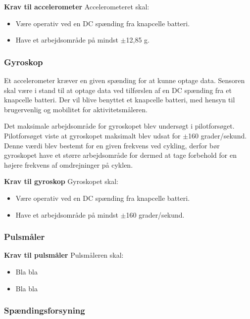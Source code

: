 \textbf{Krav til accelerometer} \newline 
Accelerometeret skal:
\begin{itemize}
\item Være operativ ved en DC spænding fra knapcelle batteri.
\item Have et arbejdsområde på mindst $\pm$12,85 g.
\end{itemize}


\subsubsection{Gyroskop} 
Et accelerometer kræver en given spænding for at kunne optage data. Sensoren skal være i stand til at optage data ved tilførslen af en DC spænding fra et knapcelle batteri. Der vil blive benyttet et knapcelle batteri, med hensyn til brugervenlig og mobilitet for aktivitetsmåleren.\newline

Det maksimale arbejdsområde for gyroskopet blev undersøgt i pilotforsøget. Pilotforsøget viste at gyroskopet maksimalt blev udsat for $\pm$160 grader/sekund. Denne værdi blev bestemt for en given frekvens ved cykling, derfor bør gyroskopet have et større arbejdsområde for dermed at tage forbehold for en højere frekvens af omdrejninger på cyklen. 


\textbf{Krav til gyroskop} \newline
Gyroskopet skal:
\begin{itemize}
\item Være operativ ved en DC spænding fra knapcelle batteri.
\item Have et arbejdsområde på mindst $\pm$160 grader/sekund.
\end{itemize}


\subsubsection{Pulsmåler}

\textbf{Krav til pulsmåler} \newline
Pulsmåleren skal:
\begin{itemize}
\item Bla bla
\item Bla bla
\end{itemize}

\subsubsection{Spændingsforsyning}

